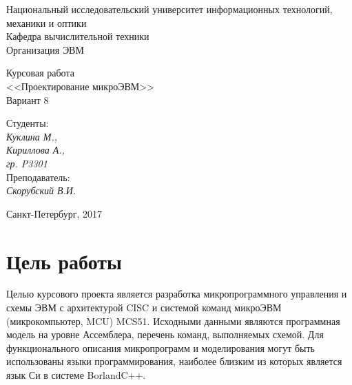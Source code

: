 \documentclass[11pt, a4paper] {ncc}
\begin{document}
\frenchspacing
\pagestyle{empty}
\begin{center}
     Национальный исследовательский университет информационных технологий,
                              механики и оптики\\
                        Кафедра вычислительной техники\\
                                Организация ЭВМ
\end{center}
\begin{center}
                               Курсовая работа\\
                          <<Проектирование микроЭВМ>>\\
                                Вариант 8
\end{center}
\begin{flushright}
                                                        Студенты: \\
                                                            {\it Куклина М., \\
                                                            Кириллова А., \\
                                                            гр. P3301} \\
                                                        Преподаватель: \\
                                                        {\it Скорубский В.И.}
\end{flushright}
\begin{center}
                                      Санкт-Петербург, 2017
\end{center}
\newpage


\section{Цель работы}
Целью курсового проекта является разработка микропрограммного управления и схемы ЭВМ с архитектурой
CISC и системой команд микроЭВМ (микрокомпьютер, MCU) MCS51.  Исходными данными являются программная
модель на уровне Ассемблера, перечень команд, выполняемых схемой.   
Для функционального описания микропрограмм и моделирования могут быть использованы языки программирования,
наиболее близким  из которых является язык Си в системе BorlandC++.     
\end{document}

